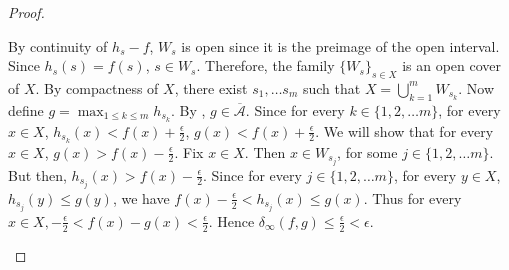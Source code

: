 \begin{proof}
\begin{step}
By continuity of $h_s - f$, $W_s$ is open since it is the preimage of the open interval. Since $h_s(s) = f(s)$, $s \in W_s$. Therefore, the family $\{ W_s \}_{s \in X}$ is an open cover of $X$. By compactness of $X$, there exist $s_1, \ldots s_m$ such that $X = \bigcup_{k = 1}^{m} W_{s_k}$. Now define $g = \operatorname{max}_{1 \leq k \leq m} h_{s_k}$.  By , $g \in \overline{\mathcal{A}}$. Since for every $k \in \{ 1, 2, \ldots m \}$, for every $x \in X$, $h_{s_k} (x) < f(x) + \frac{\epsilon}{2}$, $g(x) < f(x) + \frac{\epsilon}{2}$. We will show that for every $x \in X$, $g(x) > f(x) - \frac{\epsilon}{2}$. Fix $x \in X$. Then $x \in W_{s_j}$, for some $j \in \{ 1, 2, \ldots m \}$. But then, $h_{s_j} (x) > f(x) - \frac{\epsilon}{2}$. Since for every $j \in \{ 1, 2, \ldots m \}$, for every $y \in X$, $h_{s_j}(y) \leq g (y)$, we have $f(x) -\frac{\epsilon}{2} < h_{s_j}(x) \leq g(x)$. Thus for every $x \in X,  - \frac{\epsilon}{2} < f(x) -  g(x) < \frac{\epsilon}{2}$.
Hence $\delta_\infty(f,g) \leq \frac{\epsilon}{2} < \epsilon$.
\end{step}
\end{proof}
\newpage 

\newpage
